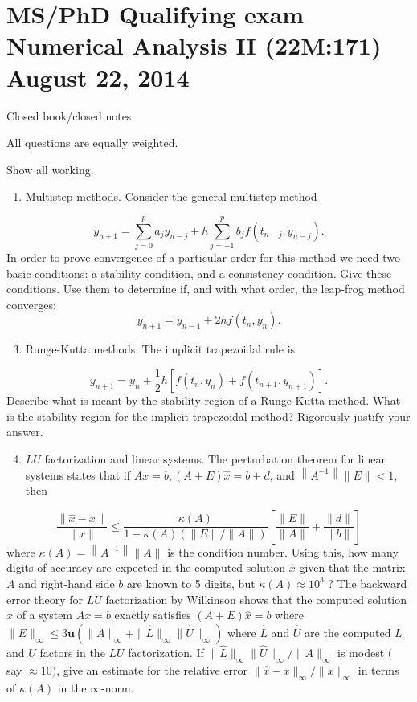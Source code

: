\documentclass[10pt]{article}
\begin{document}
\section{MS/PhD Qualifying exam 
 Numerical Analysis II (22M:171) 
 August 22, 2014}
Closed book/closed notes.

All questions are equally weighted.

Show all working.

\begin{enumerate}
  \item Multistep methods. Consider the general multistep method
\end{enumerate}
$$
y_{n+1}=\sum_{j=0}^{p} a_{j} y_{n-j}+h \sum_{j=-1}^{p} b_{j} f\left(t_{n-j}, y_{n-j}\right) .
$$
In order to prove convergence of a particular order for this method we need two basic conditions: a stability condition, and a consistency condition. Give these conditions. Use them to determine if, and with what order, the leap-frog method converges:
$$
y_{n+1}=y_{n-1}+2 h f\left(t_{n}, y_{n}\right) .
$$

\begin{enumerate}
  \setcounter{enumi}{2}
  \item Runge-Kutta methods. The implicit trapezoidal rule is
\end{enumerate}
$$
y_{n+1}=y_{n}+\frac{1}{2} h\left[f\left(t_{n}, y_{n}\right)+f\left(t_{n+1}, y_{n+1}\right)\right] .
$$
Describe what is meant by the stability region of a Runge-Kutta method. What is the stability region for the implicit trapezoidal method? Rigorously justify your answer.

\begin{enumerate}
  \setcounter{enumi}{3}
  \item $L U$ factorization and linear systems. The perturbation theorem for linear systems states that if $A x=b,(A+E) \widehat{x}=b+d$, and $\left\|A^{-1}\right\|\|E\|<1$, then
\end{enumerate}
$$
\frac{\|\widehat{x}-x\|}{\|x\|} \leq \frac{\kappa(A)}{1-\kappa(A)(\|E\| /\|A\|)}\left[\frac{\|E\|}{\|A\|}+\frac{\|d\|}{\|b\|}\right]
$$
where $\kappa(A)=\left\|A^{-1}\right\|\|A\|$ is the condition number. Using this, how many digits of accuracy are expected in the computed solution $\hat{x}$ given that the matrix $A$ and right-hand side $b$ are known to 5 digits, but $\kappa(A) \approx 10^{3}$ ? The backward error theory for $L U$ factorization by Wilkinson shows that the computed solution $\hat{x}$ of a system $A x=b$ exactly satisfies $(A+E) \widehat{x}=b$ where $\|E\|_{\infty} \leq 3 \mathbf{u}\left(\|A\|_{\infty}+\|\widehat{L}\|_{\infty}\|\widehat{U}\|_{\infty}\right)$ where $\widehat{L}$ and $\widehat{U}$ are the computed $L$ and $U$ factors in the $L U$ factorization. If $\|\widehat{L}\|_{\infty}\|\widehat{U}\|_{\infty} /\|A\|_{\infty}$ is modest $($ say $\approx 10)$, give an estimate for the relative error $\|\widehat{x}-x\|_{\infty} /\|x\|_{\infty}$ in terms of $\kappa(A)$ in the $\infty$-norm.
\end{document}

